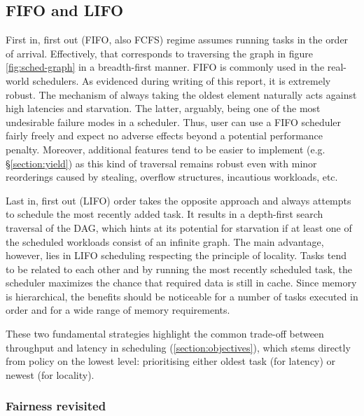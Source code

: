 \documentclass[12pt,a4paper,twoside]{report}
\begin{document}
\subsection{FIFO and LIFO}
\label{section:ordering}
First in, first out (FIFO, also FCFS) regime assumes running tasks in the order of arrival. Effectively, that corresponds to traversing the graph in figure \ref{fig:sched-graph} in a breadth-first manner. FIFO is commonly used in the real-world schedulers. As evidenced during writing of this report, it is extremely robust. The mechanism of always taking the oldest element naturally acts against high latencies and starvation. The latter, arguably, being one of the most undesirable failure modes in a scheduler. Thus, user can use a FIFO scheduler fairly freely and expect no adverse effects beyond a potential performance penalty. Moreover, additional features tend to be easier to implement (e.g. \S\ref{section:yield}) as this kind of traversal remains robust even with minor reorderings caused by stealing, overflow structures, incautious workloads, etc.

Last in, first out (LIFO) order takes the opposite approach and always attempts to schedule the most recently added task. It results in a depth-first search traversal of the DAG, which hints at its potential for starvation if at least one of the scheduled workloads consist of an infinite graph. The main advantage, however, lies in LIFO scheduling respecting the principle of locality. Tasks tend to be related to each other and by running the most recently scheduled task, the scheduler maximizes the chance that required data is still in cache. Since memory is hierarchical, the benefits should be noticeable for a number of tasks executed in order and for a wide range of memory requirements. 

These two fundamental strategies highlight the common trade-off between throughput and latency in scheduling (\ref{section:objectives}), which stems directly from policy on the lowest level: prioritising either oldest task (for latency) or newest (for locality). 


\subsubsection{Fairness revisited}
\label{section:fairness-revisited}
\end{document}
